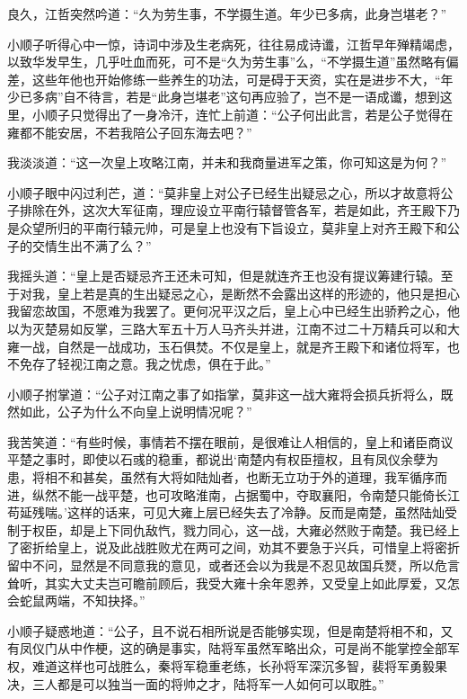 良久，江哲突然吟道：“久为劳生事，不学摄生道。年少已多病，此身岂堪老？”

小顺子听得心中一惊，诗词中涉及生老病死，往往易成诗谶，江哲早年殚精竭虑，以致华发早生，几乎吐血而死，可不是“久为劳生事”么，“不学摄生道”虽然略有偏差，这些年他也开始修练一些养生的功法，可是碍于天资，实在是进步不大，“年少已多病”自不待言，若是“此身岂堪老”这句再应验了，岂不是一语成谶，想到这里，小顺子只觉得出了一身冷汗，连忙上前道：“公子何出此言，若是公子觉得在雍都不能安居，不若我陪公子回东海去吧？”

我淡淡道：“这一次皇上攻略江南，并未和我商量进军之策，你可知这是为何？”

小顺子眼中闪过利芒，道：“莫非皇上对公子已经生出疑忌之心，所以才故意将公子排除在外，这次大军征南，理应设立平南行辕督管各军，若是如此，齐王殿下乃是众望所归的平南行辕元帅，可是皇上也没有下旨设立，莫非皇上对齐王殿下和公子的交情生出不满了么？”

我摇头道：“皇上是否疑忌齐王还未可知，但是就连齐王也没有提议筹建行辕。至于对我，皇上若是真的生出疑忌之心，是断然不会露出这样的形迹的，他只是担心我留恋故国，不愿难为我罢了。更何况平汉之后，皇上心中已经生出骄矜之心，他以为灭楚易如反掌，三路大军五十万人马齐头并进，江南不过二十万精兵可以和大雍一战，自然是一战成功，玉石俱焚。不仅是皇上，就是齐王殿下和诸位将军，也不免存了轻视江南之意。我之忧虑，俱在于此。”

小顺子拊掌道：“公子对江南之事了如指掌，莫非这一战大雍将会损兵折将么，既然如此，公子为什么不向皇上说明情况呢？”

我苦笑道：“有些时候，事情若不摆在眼前，是很难让人相信的，皇上和诸臣商议平楚之事时，即使以石彧的稳重，都说出‘南楚内有权臣擅权，且有凤仪余孽为患，将相不和甚矣，虽然有大将如陆灿者，也断无立功于外的道理，我军循序而进，纵然不能一战平楚，也可攻略淮南，占据蜀中，夺取襄阳，令南楚只能倚长江苟延残喘。’这样的话来，可见大雍上层已经失去了冷静。反而是南楚，虽然陆灿受制于权臣，却是上下同仇敌忾，戮力同心，这一战，大雍必然败于南楚。我已经上了密折给皇上，说及此战胜败尤在两可之间，劝其不要急于兴兵，可惜皇上将密折留中不问，显然是不同意我的意见，或者还会以为我是不忍见故国兵燹，所以危言耸听，其实大丈夫岂可瞻前顾后，我受大雍十余年恩养，又受皇上如此厚爱，又怎会蛇鼠两端，不知抉择。”

小顺子疑惑地道：“公子，且不说石相所说是否能够实现，但是南楚将相不和，又有凤仪门从中作梗，这的确是事实，陆将军虽然军略出众，可是尚不能掌控全部军权，难道这样也可战胜么，秦将军稳重老练，长孙将军深沉多智，裴将军勇毅果决，三人都是可以独当一面的将帅之才，陆将军一人如何可以取胜。”

